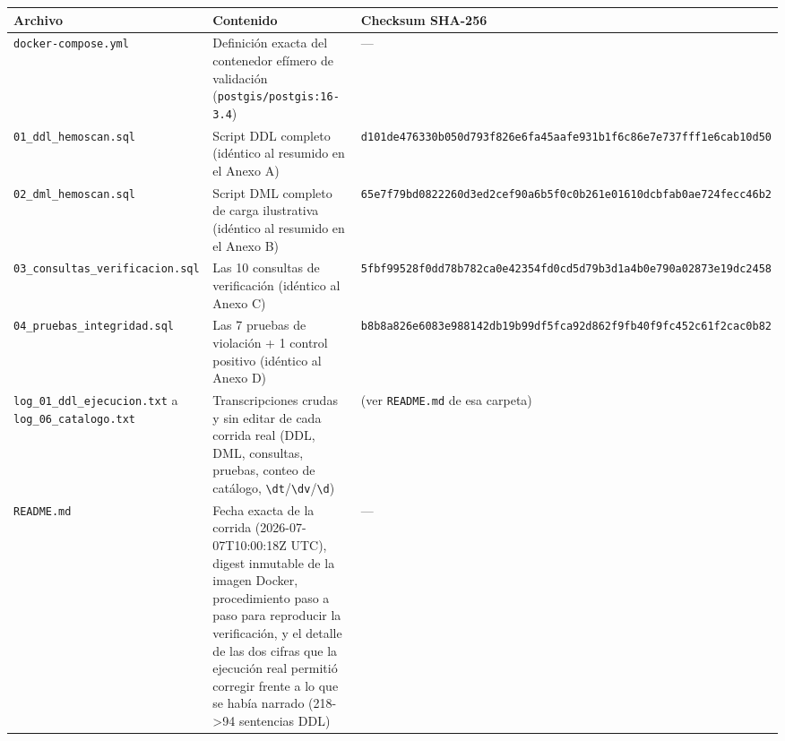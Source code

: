 \documentclass[11pt,a4paper]{article}
\begin{document}
{\small
\begin{longtable}[]{@{}
  >{\raggedright\arraybackslash}p{}
  >{\raggedright\arraybackslash}p{}
  >{\raggedright\arraybackslash}p{}@{}}
\toprule\noalign{}
\begin{minipage}[b]{\linewidth}\raggedright
Archivo
\end{minipage} & \begin{minipage}[b]{\linewidth}\raggedright
Contenido
\end{minipage} & \begin{minipage}[b]{\linewidth}\raggedright
Checksum SHA-256
\end{minipage} \\
\midrule\noalign{}
\endhead
\bottomrule\noalign{}
\endlastfoot
\texttt{docker-compose.yml} & Definición exacta del contenedor efímero de validación (\texttt{postgis/postgis:16-3.4}) & --- \\
\texttt{01\_ddl\_hemoscan.sql} & Script DDL completo (idéntico al resumido en el Anexo A) & \texttt{d101de476330b050d793f826e6fa45aafe931b1f6c86e7e737fff1e6cab10d50} \\
\texttt{02\_dml\_hemoscan.sql} & Script DML completo de carga ilustrativa (idéntico al resumido en el Anexo B) & \texttt{65e7f79bd0822260d3ed2cef90a6b5f0c0b261e01610dcbfab0ae724fecc46b2} \\
\texttt{03\_consultas\_verificacion.sql} & Las 10 consultas de verificación (idéntico al Anexo C) & \texttt{5fbf99528f0dd78b782ca0e42354fd0cd5d79b3d1a4b0e790a02873e19dc2458} \\
\texttt{04\_pruebas\_integridad.sql} & Las 7 pruebas de violación + 1 control positivo (idéntico al Anexo D) & \texttt{b8b8a826e6083e988142db19b99df5fca92d862f9fb40f9fc452c61f2cac0b82} \\
\texttt{log\_01\_ddl\_ejecucion.txt} a \texttt{log\_06\_catalogo.txt} & Transcripciones crudas y sin editar de cada corrida real (DDL, DML, consultas, pruebas, conteo de catálogo, \texttt{\textbackslash{}dt}/\texttt{\textbackslash{}dv}/\texttt{\textbackslash{}d}) & (ver \texttt{README.md} de esa carpeta) \\
\texttt{README.md} & Fecha exacta de la corrida (2026-07-07T10:00:18Z UTC), digest inmutable de la imagen Docker, procedimiento paso a paso para reproducir la verificación, y el detalle de las dos cifras que la ejecución real permitió corregir frente a lo que se había narrado (218-\textgreater94 sentencias DDL) & --- \\
\end{longtable}
}
\end{document}
